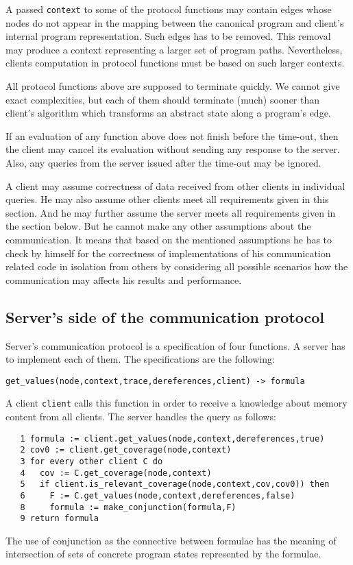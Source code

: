 \documentclass[envcountsame]{llncs}
\begin{document}
A passed \texttt{context} to some of the protocol functions may contain edges
whose nodes do not appear in the mapping between the canonical program and
client's internal program representation. Such edges has to be removed. This
removal may produce a context representing a larger set of program paths.
Nevertheless, clients computation in protocol functions must be based on such
larger contexts.

All protocol functions above are supposed to terminate quickly. We cannot give
exact complexities, but each of them should terminate (much) sooner than
client's algorithm which transforms an abstract state along a program's edge.

If an evaluation of any function above does not finish before the time-out, then
the client may cancel its evaluation without sending any response to the server.
Also, any queries from the server issued after the time-out may be ignored.

A client may assume correctness of data received from other clients in
individual queries. He may also assume other clients meet all requirements given
in this section. And he may further assume the server meets all requirements
given in the section below. But he cannot make any other assumptions about the
communication. It means that based on the mentioned assumptions he has to check
by himself for the correctness of implementations of his communication related
code in isolation from others by considering all possible scenarios how the
communication may affects his results and performance.


\subsection{Server's side of the communication protocol}
\label{sec:ServerProtocol}

Server's communication protocol is a specification of four functions. A server
has to  implement each of them. The specifications are the following: \newline

\noindent\texttt{get\_values(node,context,trace,dereferences,client) -> formula}

A client \texttt{client} calls this function in order to receive a knowledge
about memory content from all clients. The server handles the query as follows:
\begin{verbatim}
   1 formula := client.get_values(node,context,dereferences,true)
   2 cov0 := client.get_coverage(node,context)
   3 for every other client C do
   4   cov := C.get_coverage(node,context)
   5   if client.is_relevant_coverage(node,context,cov,cov0)) then
   6     F := C.get_values(node,context,dereferences,false)
   8     formula := make_conjunction(formula,F)
   9 return formula
\end{verbatim}
The use of conjunction as the connective between formulae has the meaning of
intersection of sets of concrete program states represented by the formulae.
\newline
\end{document}
